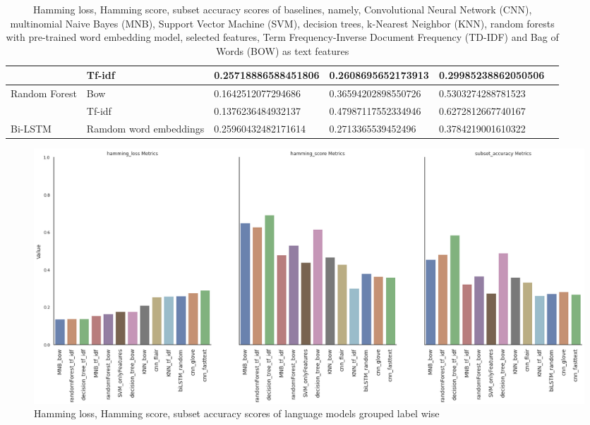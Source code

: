 \begin{table}[h!]
{\begin{tabular}{@{}llrrrr@{}}
\multicolumn{1}{|l|}{} &
  \multicolumn{1}{l|}{Tf-idf} &
  \multicolumn{1}{l|}{0.25718886588451806} &
  \multicolumn{1}{l|}{0.2608695652173913} &
  \multicolumn{1}{l|}{0.29985238862050506}  \\ \midrule
\multicolumn{1}{|l|}{\multirow{2}{*}{Random Forest}} &
  \multicolumn{1}{l|}{Bow} &
  \multicolumn{1}{l|}{0.1642512077294686} &
  \multicolumn{1}{l|}{0.36594202898550726} &
  \multicolumn{1}{l|}{0.5303274288781523} & \\ \cmidrule(l){2-5}
\multicolumn{1}{|l|}{} &
  \multicolumn{1}{l|}{Tf-idf} &
  \multicolumn{1}{l|}{0.1376236484932137} &
  \multicolumn{1}{l|}{0.47987117552334946} &
  \multicolumn{1}{l|}{0.6272812667740167} & \\ \midrule
\multicolumn{1}{|l|}{Bi-LSTM} &
  \multicolumn{1}{l|}{Ramdom word embeddings} &
  \multicolumn{1}{l|}{0.25960432482171614} &
  \multicolumn{1}{l|}{0.2713365539452496} &
  \multicolumn{1}{l|}{0.3784219001610322} \\ \bottomrule
\end{tabular}%
}
\caption{Hamming loss, Hamming score, subset accuracy scores of baselines, namely, Convolutional Neural Network (CNN), multinomial Naive Bayes (MNB), Support Vector Machine (SVM), decision trees, k-Nearest Neighbor (KNN), random forests with pre-trained word embedding model, selected features, Term Frequency-Inverse Document Frequency (TD-IDF) and Bag of Words (BOW) as text features}
\label{tab:sample_based_baseline}
\end{table}

\begin{figure}[h!]
    \centering
    \includegraphics[width=1\textwidth]{thesis/figures/HHAA_final.png}
    \caption{Hamming loss, Hamming score, subset accuracy scores of language models grouped label wise}
    \label{fig:label_wise_hhaa_baselines}
\end{figure}

